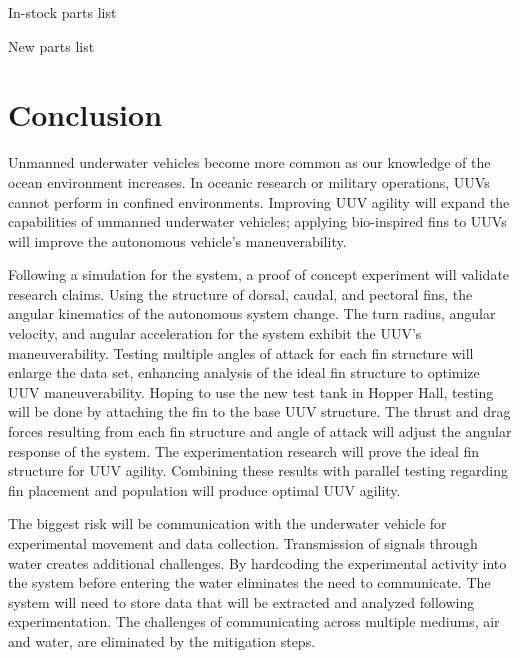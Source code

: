 \documentclass{IEEEtran}
\begin{document}
\begin{table}
\caption{In-stock parts list}
\label{tab:3}
\end{table}

\begin{table}
\caption{New parts list}
\label{tab:4}
\end{table}

\section{Conclusion}
Unmanned underwater vehicles become more common as our knowledge of the ocean environment increases.  In oceanic research or military operations, UUVs cannot perform in confined environments.  Improving UUV agility will expand the capabilities of unmanned underwater vehicles; applying bio-inspired fins to UUVs will improve the autonomous vehicle’s maneuverability.  

Following a simulation for the system, a proof of concept experiment will validate research claims.  Using the structure of dorsal, caudal, and pectoral fins, the angular kinematics of the autonomous system change.  The turn radius, angular velocity, and angular acceleration for the system exhibit the UUV’s maneuverability.  Testing multiple angles of attack for each fin structure will enlarge the data set, enhancing analysis of the ideal fin structure to optimize UUV maneuverability.  Hoping to use the new test tank in Hopper Hall, testing will be done by attaching the fin to the base UUV structure.  The thrust and drag forces resulting from each fin structure and angle of attack will adjust the angular response of the system.  The experimentation research will prove the ideal fin structure for UUV agility.  Combining these results with parallel testing regarding fin placement and population will produce optimal UUV agility.   

The biggest risk will be communication with the underwater vehicle for experimental movement and data collection.  Transmission of signals through water creates additional challenges.  By hardcoding the experimental activity into the system before entering the water eliminates the need to communicate.  The system will need to store data that will be extracted and analyzed following experimentation.  The challenges of communicating across multiple mediums, air and water, are eliminated by the mitigation steps.  
\end{document}
